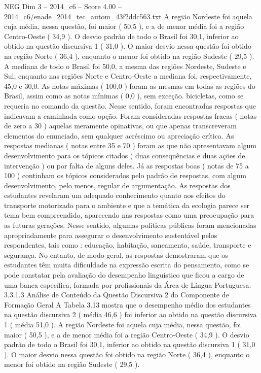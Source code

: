 \begin{textsample}{NEG Dim 3 – 2014\_c6 – Score 4.00 – 2014\_c6/enade\_2014\_tec\_autom\_43f2ddc563.txt}
A região Nordeste foi aquela cuja média, nessa questão, foi maior ( 50,5 ), e a de menor média foi a região Centro-Oeste ( 34,9 ).
O desvio padrão de todo o Brasil foi 30,1, inferior ao obtido na questão discursiva 1 ( 31,0 ).
O maior desvio nessa questão foi obtido na região Norte ( 36,4 ), enquanto o menor foi obtido na região Sudeste ( 29,5 ).
A mediana de todo o Brasil foi 50,0, a mesma das regiões Nordeste, Sudeste e Sul, enquanto nas regiões Norte e Centro-Oeste a mediana foi, respectivamente, 45,0 e 30,0.
As notas máximas ( 100,0 ) foram as mesmas em todas as regiões do Brasil, assim como as notas mínimas ( 0,0 ), sem exceção. bicicletas, como se requeria no comando da questão.
Nesse sentido, foram encontradas respostas que indicavam a caminhada como opção.
Foram consideradas respostas fracas ( notas de zero a 30 ) aquelas meramente opinativas, ou que apenas transcreveram elementos do enunciado, sem qualquer acréscimo ou apreciação crítica.
As respostas medianas ( notas entre 35 e 70 ) foram as que não apresentavam algum desenvolvimento para os tópicos citados ( duas consequências e duas ações de intervenção ) ou por falta de alguns deles.
Já as respostas boas ( notas de 75 a 100 ) continham os tópicos considerados pelo padrão de respostas, com algum desenvolvimento, pelo menos, regular de argumentação.
As respostas dos estudantes revelaram um adequado conhecimento quanto aos efeitos do transporte motorizado para o ambiente e que a temática da ecologia parece ser tema bem compreendido, aparecendo nas respostas como uma preocupação para as futuras gerações.
Nesse sentido, algumas políticas públicas foram mencionadas apropriadamente para assegurar o desenvolvimento sustentável pelos respondentes, tais como : educação, habitação, saneamento, saúde, transporte e segurança.
No entanto, de modo geral, as respostas demostraram que os estudantes têm muita dificuldade na expressão escrita do pensamento, como se pode constatar pela avaliação do desempenho linguístico que ficou a cargo de uma banca específica, formada por profissionais da Área de Língua Portuguesa. 3.3.1.3 Análise de Conteúdo da Questão Discursiva 2 do Componente de Formação Geral A Tabela 3.13 mostra que o desempenho médio dos estudantes na questão discursiva 2 ( média 46,6 ) foi inferior ao obtido na questão discursiva 1 ( média 51,0 ).
A região Nordeste foi aquela cuja média, nessa questão, foi maior ( 50,5 ), e a de menor média foi a região Centro-Oeste ( 34,9 ).
O desvio padrão de todo o Brasil foi 30,1, inferior ao obtido na questão discursiva 1 ( 31,0 ).
O maior desvio nessa questão foi obtido na região Norte ( 36,4 ), enquanto o menor foi obtido na região Sudeste ( 29,5 ).

\end{textsample}
